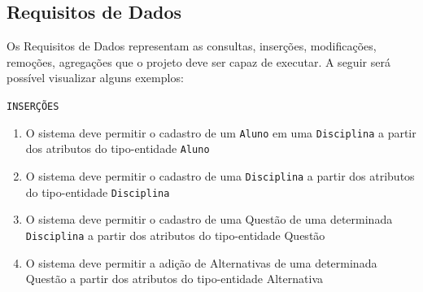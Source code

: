\documentclass[12pt,a4paper]{article}
\begin{document}
\pagebreak
\subsection{Requisitos de Dados}

Os Requisitos de Dados representam as consultas, inserções, modificações, remoções, agregações que o projeto deve ser capaz de executar. A seguir será possível visualizar alguns exemplos:

\vspace{0.5cm}
\begin{center}
    \texttt{INSERÇÕES}
\end{center}
\begin{enumerate}
    \item O sistema deve permitir o cadastro de um \texttt{Aluno} em uma \texttt{Disciplina} a partir dos atributos do tipo-entidade \texttt{Aluno}
    \item O sistema deve permitir o cadastro de uma \texttt{Disciplina} a partir dos atributos do tipo-entidade \texttt{Disciplina}
    \item O sistema deve permitir o cadastro de uma Questão de uma determinada \texttt{Disciplina} a partir dos atributos do tipo-entidade Questão
    \item O sistema deve permitir a adição de Alternativas de uma determinada Questão a partir dos atributos do tipo-entidade Alternativa
\end{enumerate}
\end{document}
